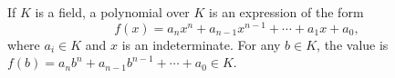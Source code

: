 If $K$ is a field, a polynomial over $K$ is an expression of the form
$$f(x) = a_n x^n + a_{n-1} x^{n-1} + \cdots + a_1 x + a_0,$$
where $a_i \in K$ and $x$ is an indeterminate. For any $b \in K$, the value is $f(b) = a_n b^n + a_{n-1} b^{n-1} + \cdots + a_0 \in K$.
